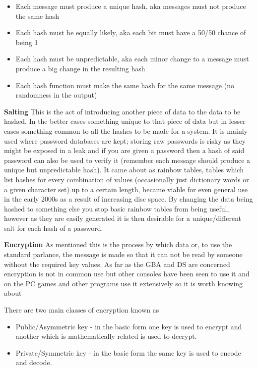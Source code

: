 \documentclass[
]{book}
\providecommand{\tightlist}{%
  \setlength{\itemsep}{0pt}\setlength{\parskip}{0pt}}
\begin{document}
\begin{itemize}
\tightlist
\item
  Each message must produce a unique hash, aka messages must not produce the same hash
\item
  Each hash must be equally likely, aka each bit must have a 50/50 chance of being 1
\item
  Each hash must be unpredictable, aka each minor change to a message must produce a big change in the resulting hash
\item
  Each hash function must make the same hash for the same message (no randomness in the output)
\end{itemize}

\textbf{Salting} This is the act of introducing another piece of data to the data to be hashed. In the better cases something unique to that piece of data but in lesser cases something common to all the hashes to be made for a system. It is mainly used where password databases are kept; storing raw passwords is risky as they might be exposed in a leak and if you are given a password then a hash of said password can also be used to verify it (remember each message should produce a unique but unpredictable hash). It came about as rainbow tables, tables which list hashes for every combination of values (occasionally just dictionary words or a given character set) up to a certain length, became viable for even general use in the early 2000s as a result of increasing disc space. By changing the data being hashed to something else you stop basic rainbow tables from being useful, however as they are easily generated it is then desirable for a unique/different salt for each hash of a password.

\textbf{Encryption} As mentioned this is the process by which data or, to use the standard parlance, the message is made so that it can not be read by someone without the required key values. As far as the GBA and DS are concerned encryption is not in common use but other consoles have been seen to use it and on the PC games and other programs use it extensively so it is worth knowing about

There are two main classes of encryption known as

\begin{itemize}
\tightlist
\item
  Public/Asymmetric key - in the basic form one key is used to encrypt and another which is mathematically related is used to decrypt.
\item
  Private/Symmetric key - in the basic form the same key is used to encode and decode.
\end{itemize}
\end{document}
